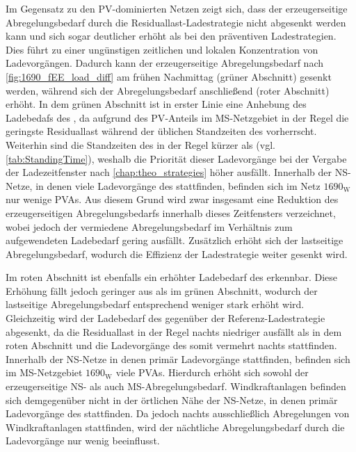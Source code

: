 Im Gegensatz zu den \gls{PV}-dominierten Netzen zeigt sich, dass der erzeugerseitige Abregelungsbedarf durch die Residuallast-Ladestrategie nicht abgesenkt werden kann und sich sogar deutlicher erhöht als bei den präventiven Ladestrategien.
Dies führt zu einer ungünstigen zeitlichen und lokalen Konzentration von Ladevorgängen.
Dadurch kann der erzeugerseitige Abregelungsbedarf nach \autoref{fig:1690_fEE_load_diff} am frühen Nachmittag (grüner Abschnitt) gesenkt werden, während sich der Abregelungsbedarf anschließend (roter Abschnitt) erhöht.
In dem grünen Abschnitt ist in erster Linie eine Anhebung des Ladebedafs des \UC \Firmeparkplatzdot, da aufgrund des \gls{PV}-Anteils im \gls{MS}-Netzgebiet in der Regel die geringste Residuallast während der üblichen Standzeiten des \UC \Firmeparkplatz vorherrscht.
Weiterhin sind die Standzeiten des \UC \Firmeparkplatz in der Regel kürzer als \zH (vgl. \autoref{tab:StandingTime}), weshalb die Priorität dieser Ladevorgänge bei der Vergabe der Ladezeitfenster nach \autoref{chap:theo_strategies} höher ausfällt.
Innerhalb der \gls{NS}-Netze, in denen viele Ladevorgänge des \UC \Firmeparkplatz stattfinden, befinden sich im Netz \(1690_{\text{W}}\) nur wenige \glspl{PVA}.
Aus diesem Grund wird zwar insgesamt eine Reduktion des erzeugerseitigen Abregelungsbedarfs innerhalb dieses Zeitfensters verzeichnet, wobei jedoch der vermiedene Abregelungsbedarf im Verhältnis zum aufgewendeten Ladebedarf gering ausfällt.
Zusätzlich erhöht sich der lastseitige Abregelungsbedarf, wodurch die Effizienz der Ladestrategie weiter gesenkt wird.



Im roten Abschnitt ist ebenfalls ein erhöhter Ladebedarf des \UC \Firmeparkplatz erkennbar.
Diese Erhöhung fällt jedoch geringer aus als im grünen Abschnitt, wodurch der lastseitige Abregelungsbedarf entsprechend weniger stark erhöht wird.
Gleichzeitig wird der Ladebedarf des \UC \zH gegenüber der Referenz-Ladestrategie abgesenkt, da die Residuallast in der Regel nachts niedriger ausfällt als in dem roten Abschnitt und die Ladevorgänge des \UC \zH somit vermehrt nachts stattfinden.
Innerhalb der \gls{NS}-Netze in denen primär Ladevorgänge \zH stattfinden, befinden sich im \gls{MS}-Netzgebiet \(1690_{\text{W}}\) viele \glspl{PVA}.
Hierdurch erhöht sich sowohl der erzeugerseitige \gls{NS}- als auch \gls{MS}-Abregelungsbedarf.
Windkraftanlagen befinden sich demgegenüber nicht in der örtlichen Nähe der \gls{NS}-Netze, in denen primär Ladevorgänge des \UC \zH stattfinden.
Da jedoch nachts ausschließlich Abregelungen von Windkraftanlagen stattfinden, wird der nächtliche Abregelungsbedarf durch die Ladevorgänge nur wenig beeinflusst.



